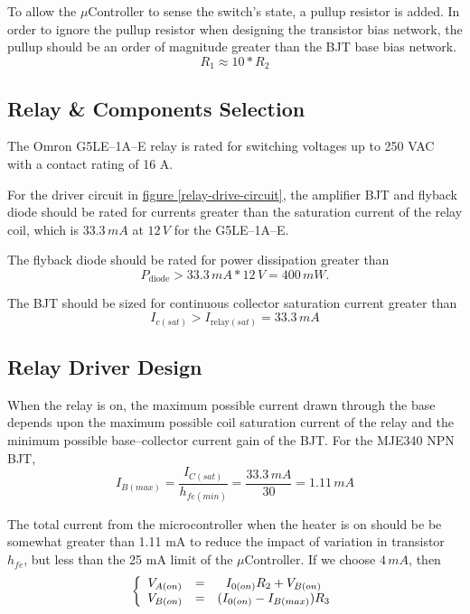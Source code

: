 \documentclass[10pt, twocolumn]{article}
\begin{document}
To allow the $\mu$Controller to sense the switch's state, a pullup resistor is added.
In order to ignore the pullup resistor when designing the transistor bias network,
the pullup should be an order of magnitude greater than the BJT base bias network.
\begin{equation}
R_{1}\approx 10*R_{2}
\label{heat-relay-pullup-eq}
\end{equation}

\subsection{Relay \& Components Selection}

The Omron G5LE--1A--E relay is rated for switching voltages up to 250 VAC
with a contact rating of 16 A. 

For the driver circuit in
\hyperref[relay-drive-circuit]{figure \ref{relay-drive-circuit}},
the amplifier BJT and flyback diode should be rated for currents
greater than the saturation current of the relay coil,
which is $33.3\,mA$ at $12\,V$ for the G5LE--1A--E.

The flyback diode should be rated for power dissipation greater than
\begin{equation*}
P_{\textrm{diode}}>33.3\,mA*12\,V=400\,mW.
\end{equation*}

The BJT should be sized for continuous collector saturation current greater than
\begin{equation}
I_{c(sat)}>I_{\textrm{relay}(sat)}=33.3\,mA
\end{equation}

\subsection{Relay Driver Design}

When the relay is on, the maximum possible current drawn through the
base depends upon the maximum possible coil saturation current of the relay
and the minimum possible base--collector current gain of the BJT.
For the MJE340 NPN BJT,
\begin{equation*}
I_{B(max)}=\frac{I_{C(sat)}}{h_{fe(min)}}=\frac{33.3\,mA}{30}=1.11\,mA
\end{equation*}

The total current from the microcontroller when the heater is on should
be be somewhat greater than 1.11 mA to reduce the impact of variation in
transistor $h_{fe}$, but less than the 25 mA limit of the $\mu$Controller.
If we choose $4\,mA$, then
\begin{equation}
\left\{\begin{array}{c c c}
V_{A(on)}	&=&	I_{0(on)}R_{2}+V_{B(on)}	\\
V_{B(on)}	&=&	(I_{0(on)}-I_{B(max)})R_{3}	\\
\end{array}\right.
\label{heat-relay-bias-network-eq}
\end{equation}
\end{document}
